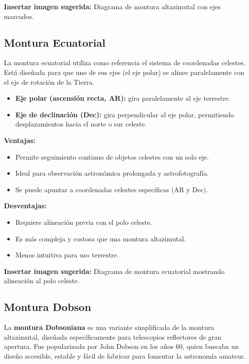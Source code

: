 \vspace{0.3cm}
\textbf{Insertar imagen sugerida:} Diagrama de montura altazimutal con ejes marcados.

\subsection{Montura Ecuatorial}
\label{subsec:montura_ecuatorial}

La montura ecuatorial utiliza como referencia el sistema de coordenadas celestes. Está diseñada para que uno de sus ejes (el eje polar) se alinee paralelamente con el eje de rotación de la Tierra.

\begin{itemize}
	\item \textbf{Eje polar (ascensión recta, AR):} gira paralelamente al eje terrestre.
	\item \textbf{Eje de declinación (Dec):} gira perpendicular al eje polar, permitiendo desplazamientos hacia el norte o sur celeste.
\end{itemize}

\textbf{Ventajas:}
\begin{itemize}
	\item Permite seguimiento continuo de objetos celestes con un solo eje.
	\item Ideal para observación astronómica prolongada y astrofotografía.
	\item Se puede apuntar a coordenadas celestes específicas (AR y Dec).
\end{itemize}

\textbf{Desventajas:}
\begin{itemize}
	\item Requiere alineación previa con el polo celeste.
	\item Es más compleja y costosa que una montura altazimutal.
	\item Menos intuitiva para uso terrestre.
\end{itemize}

\vspace{0.3cm}
\textbf{Insertar imagen sugerida:} Diagrama de montura ecuatorial mostrando alineación al polo celeste.

\subsection{Montura Dobson}
\label{subsec:montura_dobson}

La \textbf{montura Dobsoniana} es una variante simplificada de la montura altazimutal, diseñada específicamente para telescopios reflectores de gran apertura. Fue popularizada por John Dobson en los años 60, quien buscaba un diseño accesible, estable y fácil de fabricar para fomentar la astronomía amateur.

